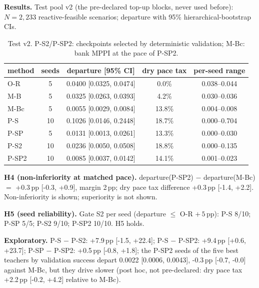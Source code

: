 \textbf{Results.} Test pool v2 (the pre-declared top-up blocks, never used before): $N=2{,}233$ reactive-feasible scenarios; departure with 95\% hierarchical-bootstrap CIs.

\begin{table}[t]\centering\small\begin{tabular}{lcccc}\toprule method & seeds & departure [95\% CI] & dry pace tax & per-seed range \\\midrule

O-R & 5 & 0.0400 [0.0325, 0.0474] & 0.0\% & 0.038--0.044 \\
M-B & 5 & 0.0325 [0.0263, 0.0393] & 4.2\% & 0.030--0.036 \\
M-Bc & 5 & 0.0055 [0.0029, 0.0084] & 13.8\% & 0.004--0.008 \\
P-S & 10 & 0.1026 [0.0146, 0.2448] & 18.7\% & 0.000--0.704 \\
P-SP & 5 & 0.0131 [0.0013, 0.0261] & 13.3\% & 0.000--0.030 \\
P-S2 & 10 & 0.0236 [0.0050, 0.0508] & 18.8\% & 0.000--0.135 \\
P-SP2 & 10 & 0.0085 [0.0037, 0.0142] & 14.1\% & 0.001--0.023 \\

\bottomrule\end{tabular}\caption{Test v2. P-S2/P-SP2: checkpoints selected by deterministic validation; M-Bc: bank MPPI at the pace of P-SP2.}\label{tab:followup}\end{table}

\textbf{H4 (non-inferiority at matched pace).} departure(P-SP2) $-$ departure(M-Bc) $=$ +0.3\,pp [-0.3, +0.9], margin 2\,pp; dry pace tax difference +0.3\,pp [-1.4, +2.2]. Non-inferiority is shown; superiority is not shown.

\textbf{H5 (seed reliability).} Gate S2 per seed (departure $\le$ O-R $+\,5$\,pp): P-S 8/10; P-SP 5/5; P-S2 9/10; P-SP2 10/10. H5 holds.

\textbf{Exploratory.} P-S $-$ P-S2: +7.9\,pp [-1.5, +22.4]; P-S $-$ P-SP2: +9.4\,pp [+0.6, +23.7]; P-SP $-$ P-SP2: +0.5\,pp [-0.8, +1.8]; the P-SP2 seeds of the five best teachers by validation success depart 0.0022 [0.0006, 0.0043], -0.3\,pp [-0.7, -0.0] against M-Bc, but they drive slower (post hoc, not pre-declared: dry pace tax +2.2\,pp [-0.2, +4.2] relative to M-Bc).
